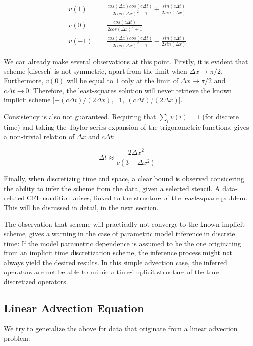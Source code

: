 \documentclass[%
  twocolumn
]{mpi2015-cscpreprint}
\begin{document}
\begin{align}
\label{discsch}
v(1)={}& \frac{cos(\Delta x) cos(c \Delta t)}{2 cos(\Delta x)^2+1}+\frac{sin(c \Delta t)}{2 sin(\Delta x)}\\
v(0)={}& \frac{cos(c \Delta t)}{2 cos(\Delta x)^2+1}\\
v(-1)={}& \frac{cos(\Delta x) cos(c \Delta t)}{2 cos(\Delta x)^2+1}-\frac{sin(c \Delta t)}{2 sin(\Delta x)}    
\end{align}

We can already make several observations at this point. Firstly, it is evident that scheme \ref{discsch} is not symmetric, apart from the limit when $\Delta x \to \pi/2$. Furthermore, $v(0)$ will be equal to $1$ only at the limit of $\Delta x \to \pi/2$ and $c \Delta t \to 0$. Therefore, the least-squares solution will never retrieve the known implicit scheme $[-(c \Delta t)/(2 \Delta x),$ $\; 1, \; (c \Delta t)/(2 \Delta x)]$.

Consistency is also not guaranteed. Requiring that $\sum_i{v(i)}=1$ (for discrete time) and taking the Taylor series expansion of the trigonometric functions, gives a non-trivial relation of $\Delta x$ and $c \Delta t$:

\begin{equation}
    \label{cons}
    \Delta t \approx \frac{2 {\Delta x}^2}{c (3+ \Delta x^2)}
\end{equation}


Finally, when discretizing time and space, a clear bound is observed considering the ability to infer the scheme from the data, given a selected stencil. A data-related CFL condition arises, linked to the structure of the least-square problem. This will be discussed in detail, in the next section.




The observation that scheme \label{discsch} will practically not converge to the known implicit scheme, gives a warning in the case of parametric model inference in discrete time: If the model parametric dependence is assumed to be the one originating from an implicit time discretization scheme, the inference process might not always yield the desired results. In this simple advection case, the inferred operators are not be able to mimic a time-implicit structure of the true discretized operators.


\subsection{Linear Advection Equation}
We try to generalize the above for data that originate from a linear advection problem:
\end{document}

